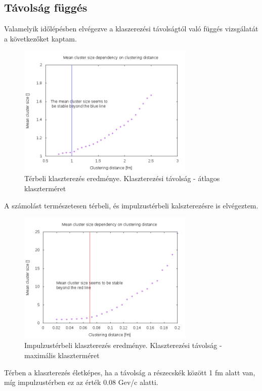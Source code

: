 \documentclass[a4paper,12pt]{article}
\begin{document}
\subsection{ Távolság függés}
\par Valamelyik időlépésben elvégezve a klaszerezési távolságtól való függés vizsgálatát a következőket kaptam.
\begin{figure}[H]
	\centering
	\includegraphics[width=0.75\textwidth]{dist-mean.png}
	\caption{ Térbeli klaszterezés eredménye. Klaszterezési távolság - átlagos klaszterméret }
\end{figure}
\par A számolást természetesen térbeli, és impulzustérbeli kalszterezésre is elvégeztem.
\begin{figure}[H]
	\centering
	\includegraphics[width=0.75\textwidth]{momdist-mean.png}
	\caption{ Impulzustérbeli klaszterezés eredménye. Klaszterezési távolság - maximális klaszterméret }
\end{figure}
\par Térben a klaszterezés életképes, ha a távolság a részecskék között 1 fm alatt van, míg impulzustérben ez az érték 0.08 Gev/c alatti.
\end{document}
